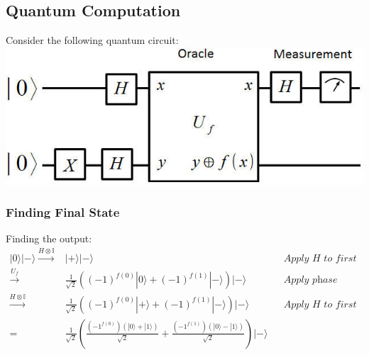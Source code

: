 \documentclass{article}
\begin{document}
\subsection{Quantum Computation}
Consider the following quantum circuit:\\
\includegraphics{The-Deutsch-Algorithm.jpg}

\subsubsection{Finding Final State}
Finding the output: \\
\begin{align*}
	|0\rangle|-\rangle \xrightarrow{H \otimes \mathbb{I}} & |+\rangle|-\rangle                                                                                                                                  &  & \textit{Apply H to first register} \\
	\xrightarrow{U_f}                                     & \frac{1}{\sqrt{2}} ((-1)^{f(0)}|0\rangle + (-1)^{f(1)}|-\rangle) |-\rangle                                                                          &  & \textit{Apply phase kickback}      \\
	\xrightarrow{H \otimes \mathbb{I}}                    & \frac{1}{\sqrt{2}} ((-1)^{f(0)}|+\rangle + (-1)^{f(1)}|-\rangle) |-\rangle                                                                          &  & \textit{Apply H to first register} \\
	=                                                     & \frac{1}{\sqrt{2}} \left( \frac{(-1^{f(0)})(|0\rangle + |1\rangle)}{\sqrt{2}} + \frac{(-1^{f(1)})(|0\rangle - |1\rangle)}{\sqrt{2}}\right)|-\rangle                                         \\
\end{align*}
\end{document}
